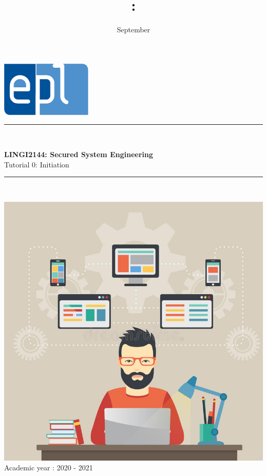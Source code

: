 \documentclass{article}
\title{\codecourse : \titlecourse}
\author{\othor}
\date{September \year}
\newcommand{\codecourse}{LINGI2144}
\newcommand{\titlecourse}{Secured System Engineering}
\newcommand{\ayear}{2020 - 2021}
\begin{document}
        \hfill\includegraphics[scale=0.5]{image/logoepl.png}
        
        \vspace*{\fill}
            
        \begin{center}
        
            \rule{1\textwidth}{1pt}\\
	            \vspace{0.5\baselineskip}
		            \begin{LARGE}
	                	\textbf{\codecourse : \titlecourse}\\
	                	Tutorial 0: Initiation
		            \end{LARGE}
		        \vspace{0.5\baselineskip}       
	        \rule{1\textwidth}{1pt}\\
	        
	        \vspace{0.5\baselineskip}
	        
	        \includegraphics[scale=1.5]{image/MCP.jpg}\\

	        \vspace{0.5\baselineskip}
	            Academic year : \ayear\\
                
		\end{center}
		
\end{document}
